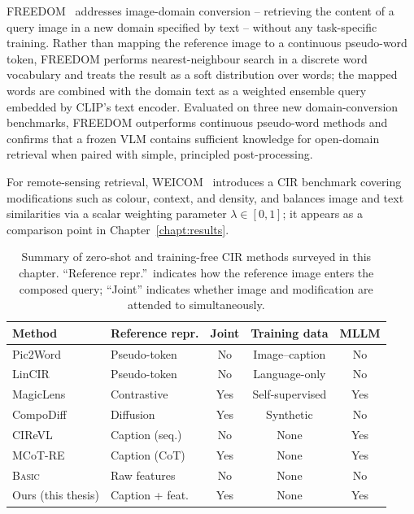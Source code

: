 FREEDOM~\cite{efthymiadis2025freedom} addresses image-domain conversion --
retrieving the content of a query image in a new domain specified by text --
without any task-specific training. Rather than mapping the reference image to a
continuous pseudo-word token, FREEDOM performs nearest-neighbour search in a
discrete word vocabulary and treats the result as a soft distribution over
words; the mapped words are combined with the domain text as a weighted ensemble
query embedded by CLIP's text encoder. Evaluated on three new domain-conversion
benchmarks, FREEDOM outperforms continuous pseudo-word methods and confirms that
a frozen VLM contains sufficient knowledge for open-domain retrieval when paired
with simple, principled post-processing.

For remote-sensing retrieval, WEICOM~\cite{psomas2024rscir} introduces a CIR
benchmark covering modifications such as colour, context, and density, and
balances image and text similarities via a scalar weighting parameter
$\lambda \in [0,1]$; it appears as a comparison point in
Chapter~\ref{chapt:results}.

\begin{table}[htbp]
  \centering
  \caption{%
    Summary of zero-shot and training-free CIR methods surveyed in
    this chapter. ``Reference repr.''\ indicates how the reference
    image enters the composed query; ``Joint'' indicates whether
    image and modification are attended to simultaneously.%
  }
  \label{tab:zeroshot_comparison}
  \begin{tabular}{llccc}
    \toprule
    Method & Reference repr. & Joint & Training data & MLLM \\
    \midrule
    Pic2Word~\cite{saito2023pic2word}
      & Pseudo-token   & No  & Image--caption  & No  \\
    LinCIR~\cite{gu2024lincir}
      & Pseudo-token   & No  & Language-only   & No  \\
    MagicLens~\cite{zhang2024magiclens}
      & Contrastive    & Yes & Self-supervised & Yes \\
    CompoDiff~\cite{gu2024compodiff}
      & Diffusion      & Yes & Synthetic       & No  \\
    CIReVL~\cite{karthik2024cirevl}
      & Caption (seq.) & No  & None            & Yes \\
    MCoT-RE~\cite{park2025mcot}
      & Caption (CoT)  & Yes & None            & Yes \\
    \textsc{Basic}~\cite{psomas2025icir}
      & Raw features   & No  & None            & No  \\
    \midrule
    Ours (this thesis)
      & Caption + feat.& Yes & None            & Yes \\
    \bottomrule
  \end{tabular}
\end{table}

